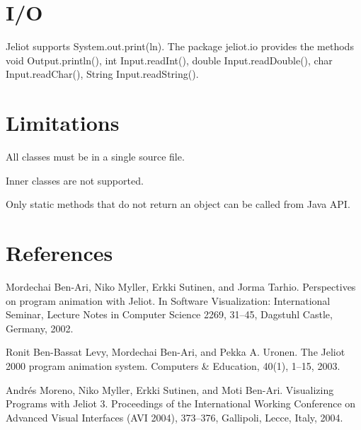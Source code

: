 \documentclass{article}
\begin{document}
\section{I/O}

Jeliot supports System.out.print(ln). The package jeliot.io provides the 
methods void Output.println(), int Input.readInt(), double Input.readDouble(), 
char Input.readChar(), String Input.readString().

\section{Limitations}

All classes must be in a single source file. 


Inner classes are not supported.

Only static methods that do not return an object can be called from Java API.

\section{References}

Mordechai Ben-Ari, Niko Myller, Erkki Sutinen, and Jorma Tarhio. Perspectives 
on program animation with Jeliot. In Software Visualization: International 
Seminar, Lecture Notes in Computer Science 2269, 31--45, Dagstuhl Castle, 
Germany, 2002.

Ronit Ben-Bassat Levy, Mordechai Ben-Ari, and Pekka A. Uronen. The Jeliot 2000 
program animation system. Computers \& Education, 40(1), 1--15, 2003.

Andr\'{e}s Moreno, Niko Myller, Erkki Sutinen, and Moti Ben-Ari. Visualizing Programs with Jeliot 3. Proceedings of the International Working Conference on Advanced Visual Interfaces (AVI 2004), 373--376, Gallipoli, Lecce, Italy, 2004.
\end{document}
